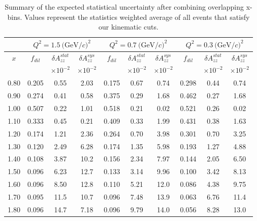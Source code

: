 \begin{table}
\begin{center}
\begin{tabular}{c|ccc|ccc|ccc}
 ~ & \multicolumn{3}{|c}{$Q^2=1.5\mathrm{~(GeV/}c)^2$} & \multicolumn{3}{|c}{$Q^2=0.7\mathrm{~(GeV/}c)^2$} & \multicolumn{3}{|c}{$Q^2=0.3\mathrm{~(GeV/}c)^2$} \\
 \hline
  $x$  & $f_{dil}$ & $\delta A_{zz}^{stat}$ & $\delta A_{zz}^{sys}$ & $f_{dil}$ & $\delta A_{zz}^{stat}$ & $\delta A_{zz}^{sys}$ & $f_{dil}$ & $\delta A_{zz}^{stat}$ & $\delta A_{zz}^{sys}$ \\
  &     & $\times 10^{-2}$  & $\times 10^{-2}$  &    & $\times 10^{-2}$  & $\times 10^{-2}$ &    & $\times 10^{-2}$  & $\times 10^{-2}$ \\
\hline\hline
 0.80	&  0.205	 & 0.55	& 2.03	& 0.175	 & 0.67	& 0.74 & 0.298 & 0.44 & 0.74 \\
 0.90	&  0.274	 & 0.41	& 0.58 	& 0.375	 & 0.29	& 1.68 & 0.462 & 0.27 & 1.68 \\
 1.00	&  0.507	 & 0.22	& 1.01 	& 0.518	 & 0.21	& 0.02 & 0.521 & 0.26 & 0.02 \\
 1.10	&  0.333	 & 0.45	& 0.21 	& 0.409	 & 0.33	& 1.99 & 0.431 & 0.38 & 1.63 \\
 1.20	&  0.174	 & 1.21	& 2.36 	& 0.264	 & 0.70	& 3.98 & 0.301 & 0.70 & 3.25 \\
 1.30	&  0.120	 & 2.49	& 6.28 	& 0.174	 & 1.35	& 5.98 & 0.193 & 1.27 & 4.88 \\
 1.40	&  0.108	 & 3.87	& 10.2 	& 0.156	 & 2.34	& 7.97 & 0.144 & 2.05 & 6.50 \\
 1.50	&  0.096	 & 6.23	& 12.7	& 0.133	 & 3.14	& 9.96 & 0.100 & 3.42 & 8.13 \\
 1.60	&  0.096	 & 8.50	& 12.8 	& 0.110	 & 5.21	& 12.0 & 0.086 & 4.38 & 9.75 \\
 1.70	&  0.095	 & 11.5	& 10.7 	& 0.096	 & 7.48	& 13.9 & 0.063 & 6.76 & 11.4 \\
 1.80	&  0.096	 & 14.7	& 7.18 	& 0.096	 & 9.79	& 14.0 & 0.056 & 8.28 & 13.0 \\
\hline\hline
\end{tabular}
\caption{\label{RATES2}Summary of the expected statistical uncertainty after combining overlapping x-bins.  Values represent the statistics weighted average of all events that satisfy our kinematic cuts. }
\end{center}
\end{table}


